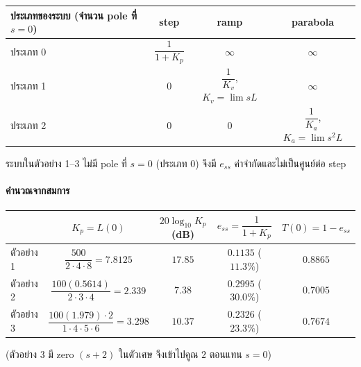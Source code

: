 \documentclass[12pt,a4paper]{article}
\begin{document}
\begin{center}
\small
\renewcommand{\arraystretch}{1.25}
\begin{tabular}{@{}lccc@{}}
\toprule
ประเภทของระบบ (จำนวน pole ที่ $s=0$) & step & ramp & parabola \\
\midrule
ประเภท 0 & $\dfrac{1}{1+K_p}$ & $\infty$ & $\infty$ \\
ประเภท 1 & $0$ & $\dfrac{1}{K_v}$, $K_v=\lim sL$ & $\infty$ \\
ประเภท 2 & $0$ & $0$ & $\dfrac{1}{K_a}$, $K_a=\lim s^2L$ \\
\bottomrule
\end{tabular}
\end{center}
ระบบในตัวอย่าง 1--3 ไม่มี pole ที่ $s=0$ (ประเภท 0) จึงมี $e_{ss}$ ค่าจำกัดและไม่เป็นศูนย์ต่อ step

\paragraph{คำนวณจากสมการ}
\begin{center}
\small
\renewcommand{\arraystretch}{1.3}
\begin{tabular}{@{}lcccc@{}}
\toprule
 & $K_p=L(0)$ & $20\log_{10}K_p$ (dB) & $e_{ss}=\dfrac{1}{1+K_p}$ & $T(0)=1-e_{ss}$ \\
\midrule
ตัวอย่าง 1 & $\dfrac{500}{2\cdot4\cdot8}=7.8125$ & $17.85$ & $0.1135$ ($11.3\%$) & $0.8865$ \\
ตัวอย่าง 2 & $\dfrac{100(0.5614)}{2\cdot3\cdot4}=2.339$ & $7.38$ & $0.2995$ ($30.0\%$) & $0.7005$ \\
ตัวอย่าง 3 & $\dfrac{100(1.979)\cdot2}{1\cdot4\cdot5\cdot6}=3.298$ & $10.37$ & $0.2326$ ($23.3\%$) & $0.7674$ \\
\bottomrule
\end{tabular}
\end{center}
(ตัวอย่าง 3 มี zero $(s+2)$ ในตัวเศษ จึงเข้าไปคูณ $2$ ตอนแทน $s=0$)
\end{document}
